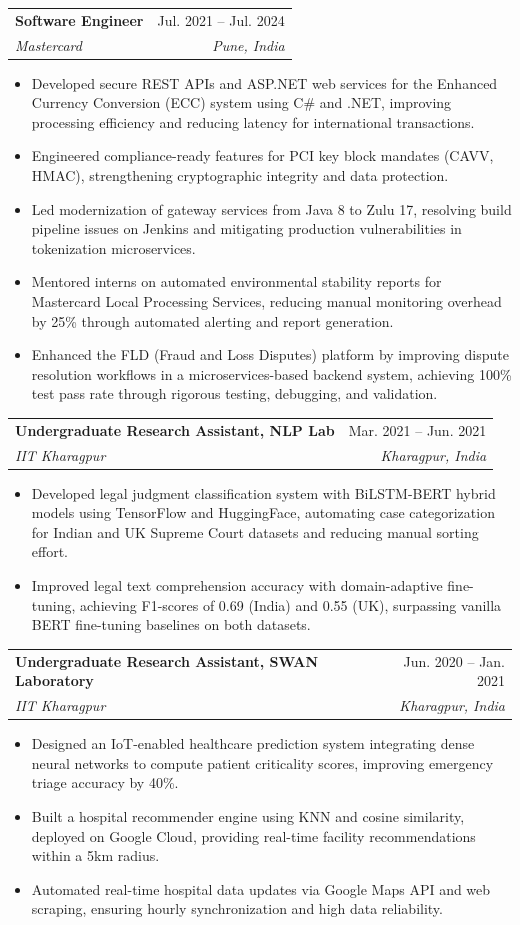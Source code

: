 \documentclass[letterpaper,11pt]{article}
\makeatletter
\newcommand{\resumeItem}[1]{
  \item\small{
    {#1 \vspace{-2pt}}
  }
}
\newcommand{\resumeSubheading}[4]{
  \vspace{-2pt}\item
    \begin{tabular*}{0.97\textwidth}[t]{l@{\extracolsep{\fill}}r}
      \textbf{#1} & #2 \\
      \textit{\small#3} & \textit{\small #4} \\
    \end{tabular*}\vspace{-7pt}
}
\newcommand{\resumeItemListStart}{\begin{itemize}[noitemsep, topsep=0pt, parsep=0pt]}
\newcommand{\resumeItemListEnd}{\end{itemize}\vspace{-5pt}}
\makeatother
\begin{document}
  \resumeSubheading
    {Software Engineer}{Jul. 2021 -- Jul. 2024}
    {Mastercard}{Pune, India}
    \resumeItemListStart
      \resumeItem{Developed secure REST APIs and ASP.NET web services for the Enhanced Currency Conversion (ECC) system using C\# and .NET, improving processing efficiency and reducing latency for international transactions.}
      \resumeItem{Engineered compliance-ready features for PCI key block mandates (CAVV, HMAC), strengthening cryptographic integrity and data protection.}
      \resumeItem{Led modernization of gateway services from Java 8 to Zulu 17, resolving build pipeline issues on Jenkins and mitigating production vulnerabilities in tokenization microservices.}
      \resumeItem{Mentored interns on automated environmental stability reports for Mastercard Local Processing Services, reducing manual monitoring overhead by 25\% through automated alerting and report generation.}
      \resumeItem{Enhanced the FLD (Fraud and Loss Disputes) platform by improving dispute resolution workflows in a microservices-based backend system, achieving 100\% test pass rate through rigorous testing, debugging, and validation.}
    \resumeItemListEnd

  \resumeSubheading
    {Undergraduate Research Assistant, NLP Lab}{Mar. 2021 -- Jun. 2021}
    {IIT Kharagpur}{Kharagpur, India}
    \resumeItemListStart
      \resumeItem{Developed legal judgment classification system with BiLSTM-BERT hybrid models using TensorFlow and HuggingFace, automating case categorization for Indian and UK Supreme Court datasets and reducing manual sorting effort.}
      \resumeItem{Improved legal text comprehension accuracy with domain-adaptive fine-tuning, achieving F1-scores of 0.69 (India) and 0.55 (UK), surpassing vanilla BERT fine-tuning baselines on both datasets.}
    \resumeItemListEnd

  \resumeSubheading
    {Undergraduate Research Assistant, SWAN Laboratory}{Jun. 2020 -- Jan. 2021}
    {IIT Kharagpur}{Kharagpur, India}
    \resumeItemListStart
      \resumeItem{Designed an IoT-enabled healthcare prediction system integrating dense neural networks to compute patient criticality scores, improving emergency triage accuracy by 40\%.}
      \resumeItem{Built a hospital recommender engine using KNN and cosine similarity, deployed on Google Cloud, providing real-time facility recommendations within a 5km radius.}
      \resumeItem{Automated real-time hospital data updates via Google Maps API and web scraping, ensuring hourly synchronization and high data reliability.}
    \resumeItemListEnd
\end{document}
